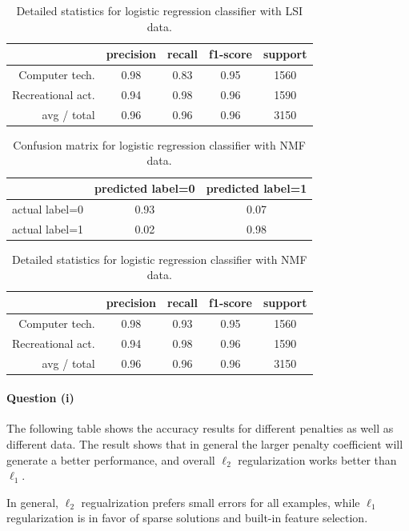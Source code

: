 \documentclass[letterpaper]{article}
\begin{document}
\begin{table}[H]
\centering
\begin{tabular}{r|cccc}
 & precision & recall & f1-score & support \\ \hline
Computer tech. & 0.98 & 0.83 & 0.95 & 1560 \\
Recreational act. & 0.94 & 0.98 & 0.96 & 1590 \\
avg / total & 0.96 & 0.96 & 0.96 & 3150 \\
\end{tabular}
\caption{Detailed statistics for logistic regression classifier
with LSI data.}
\end{table}

\begin{table}[H]
\centering
\begin{tabular}{c|cc}
 & predicted label=0 & predicted label=1 \\ \hline
actual label=0 & 0.93 & 0.07 \\
actual label=1 & 0.02 & 0.98 \\
\end{tabular}
\caption{Confusion matrix for logistic regression classifier with NMF data.}
\end{table}

\begin{table}[H]
\centering
\begin{tabular}{r|cccc}
 & precision & recall & f1-score & support \\ \hline
Computer tech. & 0.98 & 0.93 & 0.95 & 1560 \\
Recreational act. & 0.94 & 0.98 & 0.96 & 1590 \\
avg / total & 0.96 & 0.96 & 0.96 & 3150 \\
\end{tabular}
\caption{Detailed statistics for logistic regression classifier
with NMF data.}
\end{table}

\paragraph{Question (i)}
The following table shows the accuracy results for different penalties
as well as different data.
The result shows that in general the larger penalty coefficient
will generate a better performance,
and overall $\ell_2$ regularization works better than $\ell_1$.

In general, $\ell_2$ regualrization prefers small errors for all examples,
while $\ell_1$ regularization is in favor of sparse solutions
and built-in feature selection.
\end{document}
